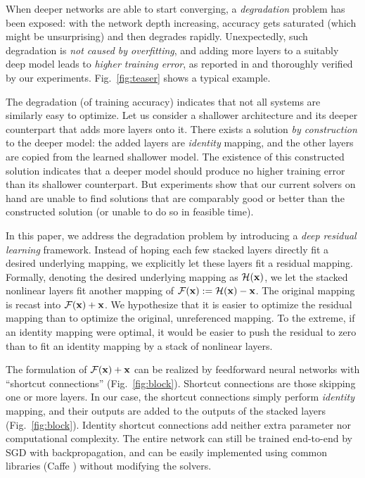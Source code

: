 When deeper networks are able to start converging, a \emph{degradation} problem has been exposed:  with the network depth increasing, accuracy gets saturated (which might be unsurprising) and then degrades rapidly. Unexpectedly, such degradation is \emph{not caused by overfitting}, and adding more layers to a suitably deep model leads to \emph{higher training error}, as reported in \cite{He2015a, Srivastava2015} and thoroughly verified by our experiments. Fig.~\ref{fig:teaser} shows a typical example.

The degradation (of training accuracy) indicates that not all systems are similarly easy to optimize. Let us consider a shallower architecture and its deeper counterpart that adds more layers onto it. There exists a solution \emph{by construction} to the deeper model: the added layers are \emph{identity} mapping, and the other layers are copied from the learned shallower model. The existence of this constructed solution indicates that a deeper model should produce no higher training error than its shallower counterpart. But experiments show that our current solvers on hand are unable to find solutions that are comparably good or better than the constructed solution (or unable to do so in feasible time).

In this paper, we address the degradation problem by introducing a \emph{deep residual learning} framework.
Instead of hoping each few stacked layers directly fit a desired underlying mapping, we explicitly let these layers fit a residual mapping. Formally, denoting the desired underlying mapping as $\mathcal{H}(\mathbf{x})$, we let the stacked nonlinear layers fit another mapping of $\mathcal{F}(\mathbf{x}):=\mathcal{H}(\mathbf{x})-\mathbf{x}$. The original mapping is recast into $\mathcal{F}(\mathbf{x})+\mathbf{x}$.
We hypothesize that it is easier to optimize the residual mapping than to optimize the original, unreferenced mapping. To the extreme, if an identity mapping were optimal, it would be easier to push the residual to zero than to fit an identity mapping by a stack of nonlinear layers.

The formulation of $\mathcal{F}(\mathbf{x})+\mathbf{x}$ can be realized by feedforward neural networks with ``shortcut connections'' (Fig.~\ref{fig:block}). Shortcut connections \cite{Bishop1995,Ripley1996,Venables1999} are those skipping one or more layers. In our case, the shortcut connections simply perform \emph{identity} mapping, and their outputs are added to the outputs of the stacked layers (Fig.~\ref{fig:block}). Identity shortcut connections add neither extra parameter nor computational complexity. The entire network can still be trained end-to-end by SGD with backpropagation, and can be easily implemented using common libraries (Caffe \cite{Jia2014}) without modifying the solvers.

